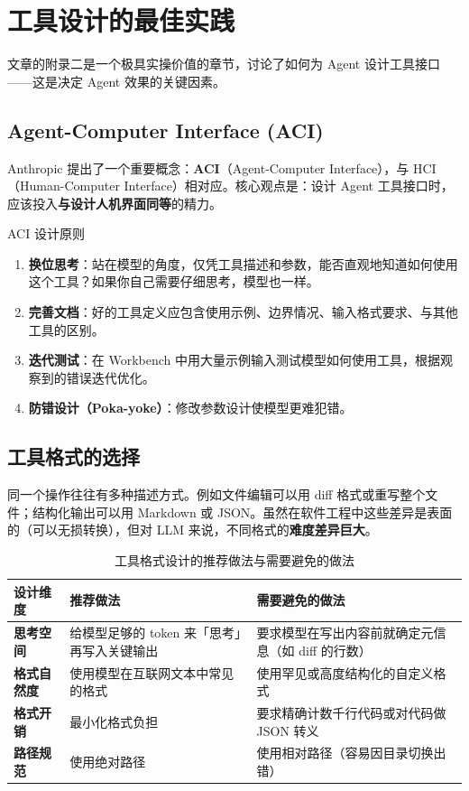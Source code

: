 \section{工具设计的最佳实践}

文章的附录二是一个极具实操价值的章节，讨论了如何为 Agent 设计工具接口——这是决定 Agent 效果的关键因素。

\subsection{Agent-Computer Interface (ACI)}

Anthropic 提出了一个重要概念：\textbf{ACI}（Agent-Computer Interface），与 HCI（Human-Computer Interface）相对应。核心观点是：设计 Agent 工具接口时，应该投入\textbf{与设计人机界面同等}的精力。

\begin{importantbox}{ACI 设计原则}
\begin{enumerate}
    \item \textbf{换位思考}：站在模型的角度，仅凭工具描述和参数，能否直观地知道如何使用这个工具？如果你自己需要仔细思考，模型也一样。
    \item \textbf{完善文档}：好的工具定义应包含使用示例、边界情况、输入格式要求、与其他工具的区别。
    \item \textbf{迭代测试}：在 Workbench 中用大量示例输入测试模型如何使用工具，根据观察到的错误迭代优化。
    \item \textbf{防错设计（Poka-yoke）}：修改参数设计使模型更难犯错。
\end{enumerate}
\end{importantbox}

\subsection{工具格式的选择}

同一个操作往往有多种描述方式。例如文件编辑可以用 diff 格式或重写整个文件；结构化输出可以用 Markdown 或 JSON。虽然在软件工程中这些差异是表面的（可以无损转换），但对 LLM 来说，不同格式的\textbf{难度差异巨大}。

\begin{table}[H]
\centering
\begin{tabular}{>{\bfseries}p{3cm} p{4.5cm} p{4.5cm}}
\toprule
设计维度 & 推荐做法 & 需要避免的做法 \\
\midrule
思考空间 & 给模型足够的 token 来「思考」再写入关键输出 & 要求模型在写出内容前就确定元信息（如 diff 的行数） \\
格式自然度 & 使用模型在互联网文本中常见的格式 & 使用罕见或高度结构化的自定义格式 \\
格式开销 & 最小化格式负担 & 要求精确计数千行代码或对代码做 JSON 转义 \\
路径规范 & 使用绝对路径 & 使用相对路径（容易因目录切换出错） \\
\bottomrule
\end{tabular}
\caption{工具格式设计的推荐做法与需要避免的做法}
\end{table}

